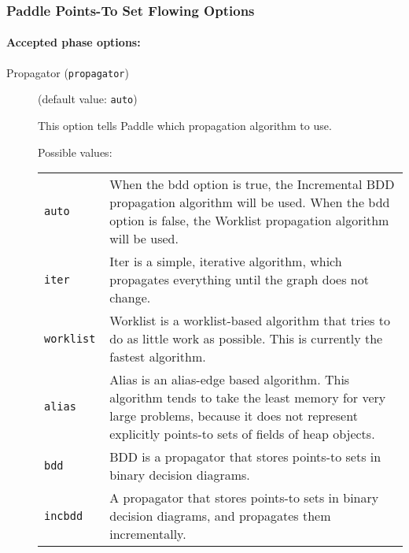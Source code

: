 \documentclass{article}
\begin{document}
\subsubsection{Paddle Points-To Set Flowing Options}


\paragraph{Accepted phase options:} 

\begin{description}

\item[Propagator ({\tt propagator})]
(default value: {\tt auto})




This option tells Paddle which propagation algorithm to use.
        



Possible values:\\
\begin{longtable}{p{1in}p{4in}}

{\tt auto }
&

When the bdd option is true, the Incremental BDD propagation algorithm will be used.
When the bdd option is false, the Worklist propagation algorithm will be used.
\\

{\tt iter }
&

Iter is a simple, iterative algorithm, which propagates everything until the
graph does not change.
\\

{\tt worklist }
&

Worklist is a worklist-based algorithm that tries
to do as little work as possible. This is currently the fastest algorithm.
\\

{\tt alias }
&

Alias is an alias-edge based algorithm. This algorithm tends to take
the least memory for very large problems, because it does not represent
explicitly points-to sets of fields of heap objects.
\\

{\tt bdd }
&

BDD is a propagator that stores points-to sets in binary decision diagrams.
\\

{\tt incbdd }
&

A propagator that stores points-to sets in binary decision diagrams, and propagates them incrementally.
\\


\end{longtable}
\end{description}
\end{document}
